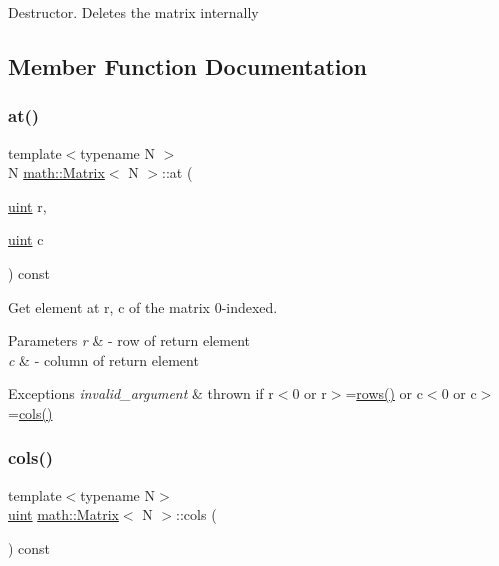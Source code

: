 Destructor. Deletes the matrix internally 

\subsection{Member Function Documentation}
\mbox{\label{classmath_1_1Matrix_aac510ef186a6bbf176d0ef4d79a7c666}} 
\subsubsection{\texorpdfstring{at()}{at()}}
{\footnotesize\ttfamily template$<$typename N $>$ \\
N \hyperlink{classmath_1_1Matrix}{math\+::\+Matrix}$<$ N $>$\+::at (\begin{DoxyParamCaption}\item[{\hyperlink{typedefs_8h_a7b9b9413622e67b9df7f2d090b48682b}{uint}}]{r,  }\item[{\hyperlink{typedefs_8h_a7b9b9413622e67b9df7f2d090b48682b}{uint}}]{c }\end{DoxyParamCaption}) const}

Get element at r, c of the matrix 0-\/indexed. 
\begin{DoxyParams}{Parameters}
{\em r} & -\/ row of return element \\
\hline
{\em c} & -\/ column of return element \\
\hline
\end{DoxyParams}

\begin{DoxyExceptions}{Exceptions}
{\em invalid\+\_\+argument} & thrown if r$<$0 or r$>$=\hyperlink{classmath_1_1Matrix_a602173645d806afe305ed77b1ff38273}{rows()} or c$<$0 or c$>$=\hyperlink{classmath_1_1Matrix_ad78b49e12a607856df124a18a855aaf1}{cols()} \\
\hline
\end{DoxyExceptions}
\mbox{\label{classmath_1_1Matrix_ad78b49e12a607856df124a18a855aaf1}} 
\subsubsection{\texorpdfstring{cols()}{cols()}}
{\footnotesize\ttfamily template$<$typename N$>$ \\
\hyperlink{typedefs_8h_a7b9b9413622e67b9df7f2d090b48682b}{uint} \hyperlink{classmath_1_1Matrix}{math\+::\+Matrix}$<$ N $>$\+::cols (\begin{DoxyParamCaption}{ }\end{DoxyParamCaption}) const\hspace{0.3cm}{\ttfamily [inline]}}

